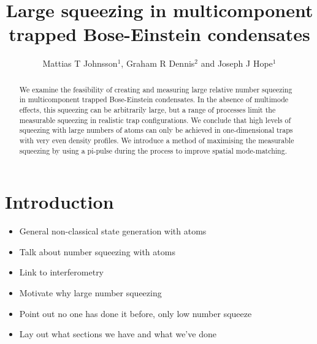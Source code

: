 \documentclass{iopart}
\begin{document}
\title{Large squeezing in multicomponent trapped Bose-Einstein condensates}

\author{Mattias T Johnsson$^1$, Graham R Dennis$^2$ and Joseph J Hope$^1$}

\address{$^1$Department of Quantum Science, Research School of Physics and Engineering, The Australian National University, Canberra ACT 0200, Australia}
\address{$^2$Plasma Research Laboratory, Research School of Physics and Engineering, The Australian National University, Canberra ACT 0200, Australia}

\begin{abstract}
We examine the feasibility of creating and measuring large relative number squeezing in multicomponent trapped Bose-Einstein condensates.  In the absence of multimode effects, this squeezing can be arbitrarily large, but a range of processes limit the measurable squeezing in realistic trap configurations.  We conclude that high levels of squeezing with large numbers of atoms can only be achieved in one-dimensional traps with very even density profiles.  We introduce a method of maximising the measurable squeezing by using a pi-pulse during the process to improve spatial mode-matching.
\end{abstract}

\maketitle

\section{Introduction}
\label{sectionIntroduction}
\begin{itemize}
  \item General non-classical state generation with atoms
  \item Talk about number squeezing with atoms
  \item Link to interferometry
  \item Motivate why large number squeezing
  \item Point out no one has done it before, only low number squeeze
  \item Lay out what sections we have and what we've done
\end{itemize}
\end{document}

